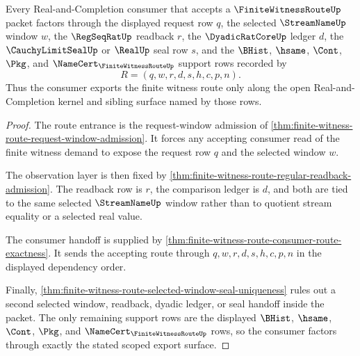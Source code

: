 \begin{theorem}
\label{thm:finite-witness-route-scoped-export-factorization}
Every Real-and-Completion consumer that accepts a $\FiniteWitnessRouteUp$ packet factors through the displayed request row $q$, the selected $\StreamNameUp$ window $w$, the $\RegSeqRatUp$ readback $r$, the $\DyadicRatCoreUp$ ledger $d$, the $\CauchyLimitSealUp$ or $\RealUp$ seal row $s$, and the $\BHist$, $\hsame$, $\Cont$, $\Pkg$, and $\NameCert_{\FiniteWitnessRouteUp}$ support rows recorded by
$$
R=(q,w,r,d,s,h,c,p,n).
$$
Thus the consumer exports the finite witness route only along the open Real-and-Completion kernel and sibling surface named by those rows.
\end{theorem}
\begin{proof}
The route entrance is the request-window admission of \autoref{thm:finite-witness-route-request-window-admission}. It forces any accepting consumer read of the finite witness demand to expose the request row $q$ and the selected window $w$.

The observation layer is then fixed by \autoref{thm:finite-witness-route-regular-readback-admission}. The readback row is $r$, the comparison ledger is $d$, and both are tied to the same selected $\StreamNameUp$ window rather than to quotient stream equality or a selected real value.

The consumer handoff is supplied by \autoref{thm:finite-witness-route-consumer-route-exactness}. It sends the accepting route through $q,w,r,d,s,h,c,p,n$ in the displayed dependency order.

Finally, \autoref{thm:finite-witness-route-selected-window-seal-uniqueness} rules out a second selected window, readback, dyadic ledger, or seal handoff inside the packet. The only remaining support rows are the displayed $\BHist$, $\hsame$, $\Cont$, $\Pkg$, and $\NameCert_{\FiniteWitnessRouteUp}$ rows, so the consumer factors through exactly the stated scoped export surface.
\end{proof}

